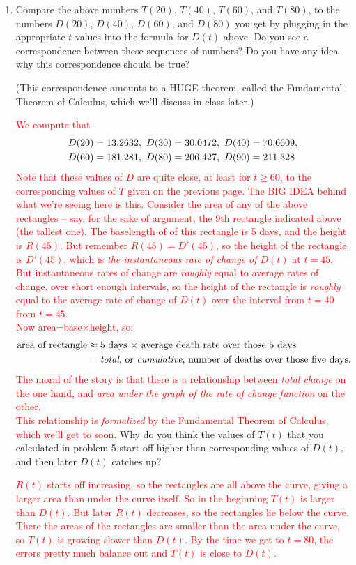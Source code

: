\documentclass[letterpaper,11pt]{article}
\newcommand{\sol}[1]{\textcolor{red}{#1}}
\newcommand{\sol}[1]{\textcolor{white}{#1}}
\begin{document}
\begin{enumerate}
\newpage
 
\item  Compare the above numbers $T(20)$,  $T(40)$, $T(60)$, and $T(80)$, to the numbers $D(20)$, $D(40)$, $D(60)$, and $D(80)$ you get by plugging in the appropriate $t$-values into the formula for $D(t)$ above.  Do you see a correspondence between these sequences of numbers?  Do you have any idea why this correspondence should be true?

\smallskip\noindent
(This correspondence amounts to a HUGE theorem, called the Fundamental Theorem of Calculus, which we'll discuss in class later.)

\sol{\quad We compute that $$\aligned D(20)&=13.2632,\  D(30)=30.0472,\  D(40)=70.6609,\\  D(60)&=181.281,\  D(80)=206.427,\  D(90)=211.328\endaligned$$
\quad Note that these values of $D$ are quite close, at least for $t\ge60$, to the corresponding values of $T$ given on the previous page. 
\vspace{5mm}
\quad The BIG IDEA behind what we're seeing here is this. Consider the area of any of the above rectangles -- say, for the sake of argument, the 9th rectangle indicated above (the tallest one). The baselength of of this rectangle is 5 days, and the height is $R(45)$.  But remember $R(45)=D'(45)$, so the height of the rectangle is  $D'(45)$, which is {\it the instantaneous rate of change of $D(t)$} at $t=45$.  But instantaneous rates of change are {\it roughly} equal to average rates of change, over short enough intervals, so the height of the rectangle is {\it roughly} equal to the average rate of change of $D(t)$ over the interval from $t=40$ from $t=45$. \\
Now area=base$\times$height, so:
$$\aligned
\hbox{area of rectangle}&\approx \hbox{5 days $\times$ average death rate over those 5 days}
\\&=\hbox{{\it total}, or {\it cumulative}, number of deaths over those five days.}\endaligned$$The moral of the story is that there is a relationship between {\it total change} on the one hand, and {\it area under the graph of the rate of change function} on the other. \\
This relationship is {\it formalized} by the Fundamental Theorem of Calculus, which we'll get to soon.}
\vfill
Why do you think the values of $T(t)$ that you calculated in problem 5 start off higher than corresponding values of $D(t)$, and then later $D(t)$ catches up?

\sol{\quad $R(t)$ starts off increasing, so the rectangles are all above the curve, giving a larger area than under the curve itself.  So in the beginning $T(t)$ is larger than $D(t)$.  But later $R(t)$ decreases, so the rectangles lie below the curve.  There the areas of the rectangles are smaller than the area under the curve, so $T(t)$ is growing slower than $D(t)$.  By the time we get to $t=80$, the errors pretty much balance out and $T(t)$ is close to $D(t)$. }
\vfill

\end{enumerate}
\end{document}
